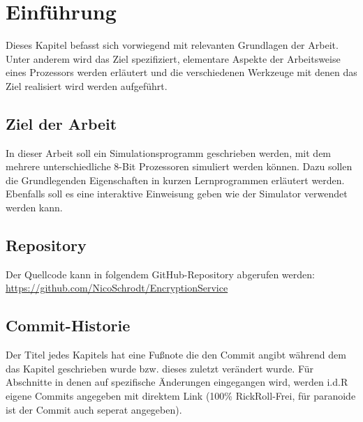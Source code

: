 \documentclass[12pt]{article}
\begin{document}
\clearpairofpagestyles
\clearmainofpairofpagestyles

\ihead[]{\leftmark} %

\cfoot[\pagemark]{\pagemark} %



\section{Einführung}
Dieses Kapitel befasst sich vorwiegend mit relevanten Grundlagen der Arbeit. Unter anderem wird das Ziel spezifiziert, elementare Aspekte der Arbeitsweise eines Prozessors werden erläutert und die verschiedenen Werkzeuge mit denen das Ziel realisiert wird werden aufgeführt.

\subsection{Ziel der Arbeit}
In dieser Arbeit soll ein Simulationsprogramm geschrieben werden, mit dem mehrere unterschiedliche 8-Bit Prozessoren simuliert werden können. Dazu sollen die Grundlegenden Eigenschaften in kurzen Lernprogrammen erläutert werden. Ebenfalls soll es eine interaktive Einweisung geben wie der Simulator verwendet werden kann.

\subsection{Repository}
Der Quellcode kann in folgendem GitHub-Repository abgerufen werden:\\ \url{https://github.com/NicoSchrodt/EncryptionService}

\subsection{Commit-Historie}
Der Titel jedes Kapitels hat eine Fußnote die den Commit angibt während dem das Kapitel geschrieben wurde bzw. dieses zuletzt verändert wurde. Für Abschnitte in denen auf spezifische Änderungen eingegangen wird, werden i.d.R eigene Commits angegeben mit direktem Link (100\% RickRoll-Frei, für paranoide ist der Commit auch seperat angegeben).
\end{document}
